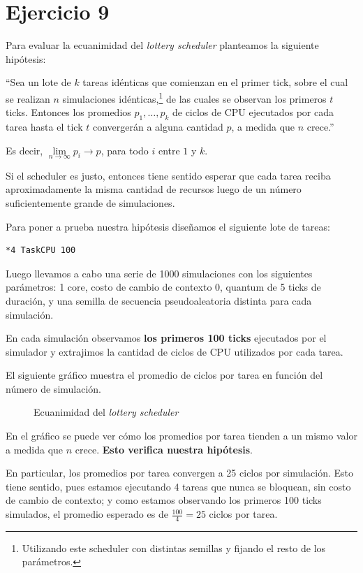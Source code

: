 \documentclass[a4paper,10pt,twoside]{article}
\begin{document}
\section{Ejercicio 9}

Para evaluar la ecuanimidad del \textit{lottery scheduler} planteamos la siguiente hipótesis:

``Sea un lote de $k$ tareas idénticas que comienzan en el primer tick, sobre el cual se realizan $n$ simulaciones idénticas,\footnote{Utilizando este scheduler con distintas semillas y fijando el resto de los parámetros.} de las cuales se observan los primeros $t$ ticks. Entonces los promedios $p_1, \ldots, p_k$ de ciclos de CPU ejecutados por cada tarea hasta el tick $t$ convergerán a alguna cantidad $p$, a medida que $n$ crece.''

Es decir, $\lim \limits_{n \to \infty} p_i \to p$, para todo $i$ entre $1$ y $k$.

Si el scheduler es justo, entonces tiene sentido esperar que cada tarea reciba aproximadamente la misma cantidad de recursos luego de un número suficientemente grande de simulaciones. 

Para poner a prueba nuestra hipótesis diseñamos el siguiente lote de tareas:

\begin{verbatim}
*4 TaskCPU 100
\end{verbatim}

Luego llevamos a cabo una serie de 1000 simulaciones con los siguientes parámetros: 1 core, costo de cambio de contexto 0, quantum de 5 ticks de duración, y una semilla de secuencia pseudoaleatoria distinta para cada simulación.

En cada simulación observamos \textbf{los primeros 100 ticks} ejecutados por el simulador y extrajimos la cantidad de ciclos de CPU utilizados por cada tarea.

El siguiente gráfico muestra el promedio de ciclos por tarea en función del número de simulación.

\begin{figure}[H]
	\centering
	
	\caption{Ecuanimidad del \textit{lottery scheduler}}
\end{figure}

En el gráfico se puede ver cómo los promedios por tarea tienden a un mismo valor a medida que $n$ crece. \textbf{Esto verifica nuestra hipótesis}.

En particular, los promedios por tarea convergen a 25 ciclos por simulación. Esto tiene sentido, pues estamos ejecutando 4 tareas que nunca se bloquean, sin costo de cambio de contexto; y como estamos observando los primeros 100 ticks simulados, el promedio esperado es de $\frac{100}{4} = 25$ ciclos por tarea.
\end{document}
